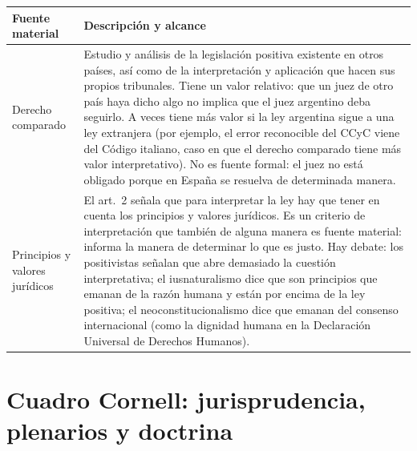 \documentclass[12pt,oneside]{book}
\begin{document}
\begin{table}[H]
\centering
\begin{tabularx}{\textwidth}{>{\raggedright\arraybackslash}p{} >{\raggedright\arraybackslash}X}
\toprule
\textbf{Fuente material} & \textbf{Descripción y alcance} \\
\midrule
Derecho comparado &
Estudio y análisis de la legislación positiva existente en otros países, así como de la interpretación y aplicación que hacen sus propios tribunales. Tiene un valor relativo: que un juez de otro país haya dicho algo no implica que el juez argentino deba seguirlo. A veces tiene más valor si la ley argentina sigue a una ley extranjera (por ejemplo, el error reconocible del CCyC viene del Código italiano, caso en que el derecho comparado tiene más valor interpretativo). No es fuente formal: el juez no está obligado porque en España se resuelva de determinada manera. \\
\addlinespace
Principios y valores jurídicos &
El art.~2 señala que para interpretar la ley hay que tener en cuenta los principios y valores jurídicos. Es un criterio de interpretación que también de alguna manera es fuente material: informa la manera de determinar lo que es justo. Hay debate: los positivistas señalan que abre demasiado la cuestión interpretativa; el iusnaturalismo dice que son principios que emanan de la razón humana y están por encima de la ley positiva; el neoconstitucionalismo dice que emanan del consenso internacional (como la dignidad humana en la Declaración Universal de Derechos Humanos). \\
\bottomrule
\end{tabularx}
\end{table}

\section{Cuadro Cornell: jurisprudencia, plenarios y doctrina}
\end{document}
